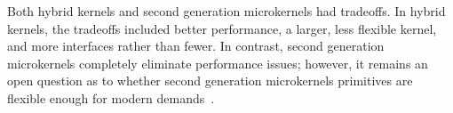 Both hybrid kernels and second generation microkernels had tradeoffs.  In
hybrid kernels, the tradeoffs included better performance, a larger, less
flexible kernel, and more interfaces rather than fewer.  In contrast,
second generation microkernels completely eliminate performance issues;
however, it remains an open question as to whether second generation
microkernels primitives are flexible enough for modern
demands~\cite{stallings2005}.
%
